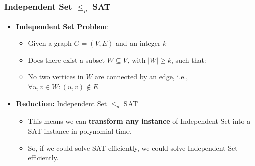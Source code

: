 \documentclass[10pt,aspectratio=43]{beamer}
\begin{document}
\begin{frame}
    \frametitle{Independent Set $\leq_p$ SAT}

    \begin{itemize}
        \item \textbf{Independent Set Problem}:
        \begin{itemize}
            \item Given a graph $G = (V, E)$ and an integer $k$
            \item Does there exist a subset $W \subseteq V$, with $|W| \geq k$, such that:
            \item No two vertices in $W$ are connected by an edge, i.e., $\forall u,v \in W: (u,v) \notin E$
        \end{itemize}

        \item \textbf{Reduction:} Independent Set $\leq_p$ SAT
        \begin{itemize}
            \item This means we can \textbf{transform any instance} of Independent Set into a SAT instance in polynomial time.
            \item So, if we could solve SAT efficiently, we could solve Independent Set efficiently.
        \end{itemize}
    \end{itemize}
\end{frame}
\end{document}
